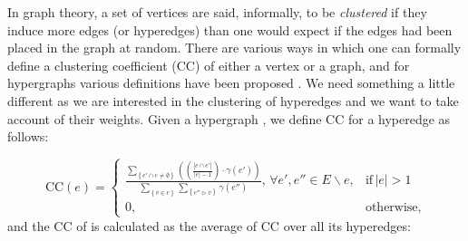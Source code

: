 \documentclass[twocolumn]{svjour3}          \smartqed
\begin{document}
In graph theory, a set of vertices are said, informally, to be \textit{clustered} if they induce more edges (or hyperedges) than one would expect if the edges had been placed in the graph at random.  There are various ways in which one can formally define a clustering coefficient (CC) of either a vertex or a graph, and for hypergraphs various definitions have been proposed \cite{gavin2002functional,klamt2009hypergraphs,latapy2008basic}.  We need something a little different as we are interested in the clustering of hyperedges and we want to take account of their weights.  Given a hypergraph , we define {CC} for a hyperedge  as follows:

\begin{dmath}\label{eq:cc}
\text{CC}(e) =
\begin{cases}
 \frac{\sum\nolimits_{\left\lbrace e' \cap e \neq \emptyset \right\rbrace} \left( \left( \frac{\left\vert {e \cap e'} \right\vert}{\left\vert {e} \right\vert-1} \right) \cdot \gamma(e') \right)}{\sum\nolimits_{\left\lbrace v \in e \right\rbrace} \sum\nolimits_{\left\lbrace e'' \triangleright v \right\rbrace } \gamma(e'')}, \, \forall e',e'' \in E \backslash e, & \mbox{if} \, \left\vert {e} \right\vert >1 \\
 0, & \mbox{otherwise},
\end{cases}
\end{dmath}
and the CC of  is calculated as the average of CC over all its hyperedges: 
\end{document}
